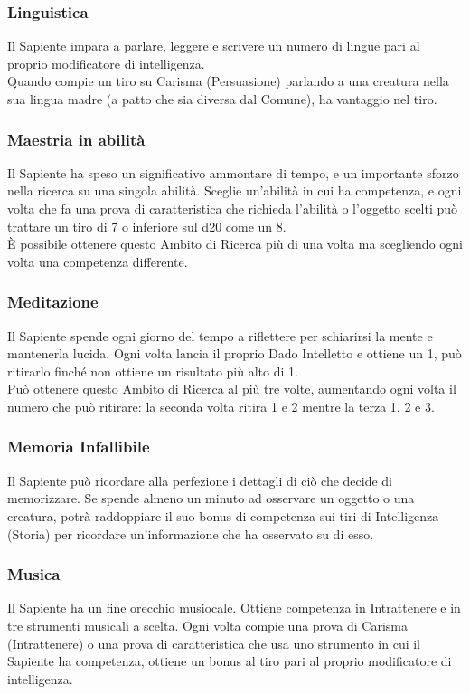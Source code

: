 \subsubsection{Linguistica}
Il Sapiente impara a parlare, leggere e scrivere un numero di lingue pari al proprio modificatore di intelligenza.\\
Quando compie un tiro su Carisma (Persuasione) parlando a una creatura nella sua lingua madre (a patto che sia diversa dal Comune), ha vantaggio nel tiro.

\subsubsection{Maestria in abilità}
Il Sapiente ha speso un significativo ammontare di tempo, e un importante sforzo nella ricerca su una singola abilità. Sceglie un'abilità in cui ha competenza, e ogni volta che fa una prova di caratteristica che richieda l'abilità o l'oggetto scelti può trattare un tiro di 7 o inferiore sul d20 come un 8.\\
È possibile ottenere questo Ambito di Ricerca più di una volta ma scegliendo ogni volta una competenza differente.

\subsubsection{Meditazione}
Il Sapiente spende ogni giorno del tempo a riflettere per schiarirsi la mente e mantenerla lucida. Ogni volta lancia il proprio Dado Intelletto e ottiene un 1, può ritirarlo finché non ottiene un risultato più alto di 1.\\
Può ottenere questo Ambito di Ricerca al più tre volte, aumentando ogni volta il numero che può ritirare: la seconda volta ritira 1 e 2 mentre la terza 1, 2 e 3.

\subsubsection{Memoria Infallibile}
Il Sapiente può ricordare alla perfezione i dettagli di ciò che decide di memorizzare. Se spende almeno un minuto ad osservare un oggetto o una creatura, potrà raddoppiare il suo bonus di competenza sui tiri di Intelligenza (Storia) per ricordare un'informazione che ha osservato su di esso.

\subsubsection{Musica}
Il Sapiente ha un fine orecchio musiocale. Ottiene competenza in Intrattenere e in tre strumenti musicali a scelta. Ogni volta compie una prova di Carisma (Intrattenere) o una prova di caratteristica che usa uno strumento in cui il Sapiente ha competenza, ottiene un bonus al tiro pari al proprio modificatore di intelligenza.

